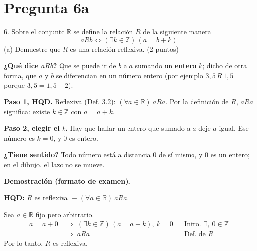 \documentclass[11pt]{article}
\begin{document}
\section*{Pregunta 6a}

6. Sobre el conjunto $\mathbb R$ se define la relación $R$ de la siguiente manera
\[aRb\Leftrightarrow(\exists k\in\mathbb Z)\,(a=b+k)\]
(a) Demuestre que $R$ es una relación \colorbox{green!35}{reflexiva}. \hfill (2 puntos)

\begin{center}
\end{center}


\begin{explica}
\textbf{¿Qué dice $aRb$?} Que se puede ir de $b$ a $a$ sumando un \textbf{entero} $k$; dicho de otra forma, que $a$ y $b$ se diferencian en un número entero (por ejemplo $3{,}5\,R\,1{,}5$ porque $3{,}5=1{,}5+2$).

\textbf{Paso 1, HQD.} Reflexiva (Def. 3.2): $(\forall a\in\mathbb R)\ aRa$. Por la definición de $R$, $aRa$ significa: existe $k\in\mathbb Z$ con $a=a+k$.

\textbf{Paso 2, elegir el $k$.} Hay que hallar un entero que sumado a $a$ deje $a$ igual. Ese número es $k=0$, y $0$ es entero.

\textbf{¿Tiene sentido?} Todo número está a distancia $0$ de sí mismo, y $0$ es un entero; en el dibujo, el lazo no se mueve.
\end{explica}

\textbf{Demostración (formato de examen).}

\textbf{HQD:} $R$ es reflexiva $\equiv(\forall a\in\mathbb R)\ aRa$.

Sea $a\in\mathbb R$ fijo pero arbitrario.
\begin{align*}
a=a+0 &\ \Rightarrow\ (\exists k\in\mathbb Z)\,(a=a+k),\ k=0 && \text{Intro. }\exists,\ 0\in\mathbb Z\\
&\ \Rightarrow\ aRa && \text{Def. de } R
\end{align*}
Por lo tanto, $R$ es reflexiva.
\end{document}
